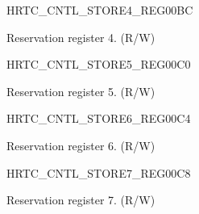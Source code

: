 \begin{register}{H}{RTC\_CNTL\_STORE4\_REG}{\hexprefix{}00BC}\label{regdesc:RTCCNTLSTORE4REG}
%
\regnewline%
\begin{regdesc}\begin{reglist}
\label{fielddesc:RTCCNTLRTCSCRATCH4}\item [RTC\_CNTL\_RTC\_SCRATCH4] Reservation register 4. (R/W)
\end{reglist}\end{regdesc}
\end{register}


\begin{register}{H}{RTC\_CNTL\_STORE5\_REG}{\hexprefix{}00C0}\label{regdesc:RTCCNTLSTORE5REG}
%
\regnewline%
\begin{regdesc}\begin{reglist}
\label{fielddesc:RTCCNTLRTCSCRATCH5}\item [RTC\_CNTL\_RTC\_SCRATCH5] Reservation register 5. (R/W)
\end{reglist}\end{regdesc}
\end{register}


\begin{register}{H}{RTC\_CNTL\_STORE6\_REG}{\hexprefix{}00C4}\label{regdesc:RTCCNTLSTORE6REG}
%
\regnewline%
\begin{regdesc}\begin{reglist}
\label{fielddesc:RTCCNTLRTCSCRATCH6}\item [RTC\_CNTL\_RTC\_SCRATCH6] Reservation register 6. (R/W)
\end{reglist}\end{regdesc}
\end{register}


\begin{register}{H}{RTC\_CNTL\_STORE7\_REG}{\hexprefix{}00C8}\label{regdesc:RTCCNTLSTORE7REG}
%
\regnewline%
\begin{regdesc}\begin{reglist}
\label{fielddesc:RTCCNTLRTCSCRATCH7}\item [RTC\_CNTL\_RTC\_SCRATCH7] Reservation register 7. (R/W)
\end{reglist}\end{regdesc}
\end{register}


